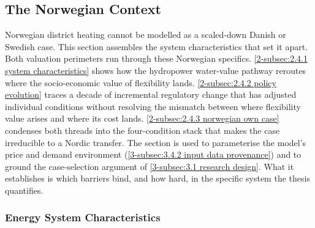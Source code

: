 \subsection{The Norwegian Context}
\label{2-subsec:2.4 norwegian context}

Norwegian district heating cannot be modelled as a scaled-down Danish or Swedish case. This section assembles the system characteristics that set it apart. Both valuation perimeters run through these Norwegian specifics. \autoref{2-subsec:2.4.1 system characteristics} shows how the hydropower water-value pathway reroutes where the socio-economic value of flexibility lands. \autoref{2-subsec:2.4.2 policy evolution} traces a decade of incremental regulatory change that has adjusted individual conditions without resolving the mismatch between where flexibility value arises and where its cost lands. \autoref{2-subsec:2.4.3 norwegian own case} condenses both threads into the four-condition stack that makes the case irreducible to a Nordic transfer. The section is used to parameterise the model's price and demand environment (\autoref{3-subsec:3.4.2 input data provenance}) and to ground the case-selection argument of \autoref{3-subsec:3.1 research design}. What it establishes is which barriers bind, and how hard, in the specific system the thesis quantifies.


\subsubsection{Energy System Characteristics}
\label{2-subsec:2.4.1 system characteristics}

